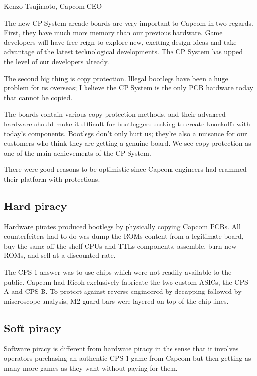 \begin{q}{Kenzo Tsujimoto, Capcom CEO\cite{gamest38}}
    
The new CP System arcade boards are very important to Capcom in two regards. First, they have much more memory than our previous hardware. Game developers will have free reign to explore new, exciting design ideas and take advantage of the latest technological developments. The CP System has upped the level of our developers already.

The second big thing is copy protection. Illegal bootlegs have been a huge problem for us overseas; I believe the CP System is the only PCB hardware today that cannot be copied.

The boards contain various copy protection methods, and their advanced hardware should make it difficult for bootleggers seeking to create knockoffs with today's components. Bootlegs don't only hurt us; they're also a nuisance for our customers who think they are getting a genuine board. We see copy protection as one of the main achievements of the CP System.
\end{q}


There were good reasons to be optimistic since Capcom engineers had crammed their platform with protections.

\subsection{Hard piracy}

Hardware pirates produced bootlegs by physically copying Capcom PCBs. All counterfeiters had to do was dump the ROMs content from a legitimate board, buy the same off-the-shelf CPUs and TTLs components, assemble, burn new ROMs, and sell at a discounted rate.

The CPS-1 answer was to use chips which were not readily available to the public. Capcom had Ricoh exclusively fabricate the two custom ASICs, the CPS-A and CPS-B. To protect against reverse-engineered by decapping followed by miscroscope analysis, M2 guard bars were layered on top of the chip\cite{arcadeHackerCPS1Rev} lines. 


\subsection{Soft piracy}
Software piracy is different from hardware piracy in the sense that it involves operators purchasing an authentic CPS-1 game from Capcom but then getting as many more games as they want without paying for them.

